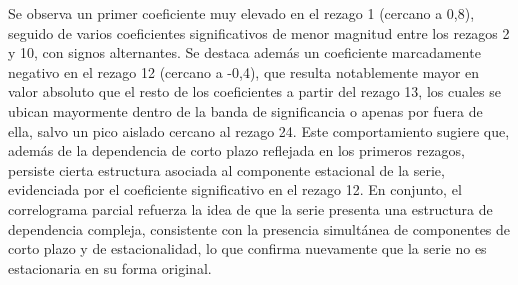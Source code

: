 \documentclass[
  spanish,
  11pt,
  letterpaper,
  DIV=11,
  numbers=noendperiod]{scrartcl}
\begin{document}
Se observa un primer coeficiente muy elevado en el rezago 1 (cercano a
0,8), seguido de varios coeficientes significativos de menor magnitud
entre los rezagos 2 y 10, con signos alternantes. Se destaca además un
coeficiente marcadamente negativo en el rezago 12 (cercano a -0,4), que
resulta notablemente mayor en valor absoluto que el resto de los
coeficientes a partir del rezago 13, los cuales se ubican mayormente
dentro de la banda de significancia o apenas por fuera de ella, salvo un
pico aislado cercano al rezago 24. Este comportamiento sugiere que,
además de la dependencia de corto plazo reflejada en los primeros
rezagos, persiste cierta estructura asociada al componente estacional de
la serie, evidenciada por el coeficiente significativo en el rezago 12.
En conjunto, el correlograma parcial refuerza la idea de que la serie
presenta una estructura de dependencia compleja, consistente con la
presencia simultánea de componentes de corto plazo y de estacionalidad,
lo que confirma nuevamente que la serie no es estacionaria en su forma
original.
\end{document}
